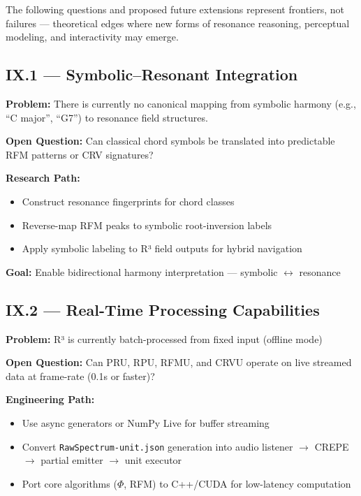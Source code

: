 The following questions and proposed future extensions represent frontiers, not failures — theoretical edges where new forms of resonance reasoning, perceptual modeling, and interactivity may emerge.

\subsection*{IX.1 — Symbolic–Resonant Integration}

\textbf{Problem:}  
There is currently no canonical mapping from symbolic harmony (e.g., “C major”, “G7”) to resonance field structures.

\textbf{Open Question:}  
Can classical chord symbols be translated into predictable RFM patterns or CRV signatures?

\textbf{Research Path:}
\begin{itemize}
    \item Construct resonance fingerprints for chord classes
    \item Reverse-map RFM peaks to symbolic root-inversion labels
    \item Apply symbolic labeling to R³ field outputs for hybrid navigation
\end{itemize}

\textbf{Goal:}  
Enable bidirectional harmony interpretation — symbolic $\leftrightarrow$ resonance

\subsection*{IX.2 — Real-Time Processing Capabilities}

\textbf{Problem:}  
R³ is currently batch-processed from fixed input (offline mode)

\textbf{Open Question:}  
Can PRU, RPU, RFMU, and CRVU operate on live streamed data at frame-rate (0.1s or faster)?

\textbf{Engineering Path:}
\begin{itemize}
    \item Use async generators or NumPy Live for buffer streaming
    \item Convert \texttt{RawSpectrum-unit.json} generation into audio listener $\rightarrow$ CREPE $\rightarrow$ partial emitter $\rightarrow$ unit executor
    \item Port core algorithms ($\Phi$, RFM) to C++/CUDA for low-latency computation
\end{itemize}

